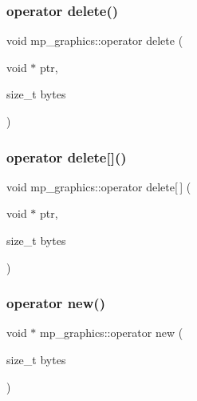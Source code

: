 \mbox{\label{classmp__graphics_a6837492938bddfa1192c3c68cc4c7626}} 
\subsubsection{\texorpdfstring{operator delete()}{operator delete()}}
{\footnotesize\ttfamily void mp\+\_\+graphics\+::operator delete (\begin{DoxyParamCaption}\item[{void $\ast$}]{ptr,  }\item[{size\+\_\+t}]{bytes }\end{DoxyParamCaption})}

\mbox{\label{classmp__graphics_a002d6cbdfd131c2925e1083781a9c8af}} 
\subsubsection{\texorpdfstring{operator delete[]()}{operator delete[]()}}
{\footnotesize\ttfamily void mp\+\_\+graphics\+::operator delete\mbox{[}$\,$\mbox{]} (\begin{DoxyParamCaption}\item[{void $\ast$}]{ptr,  }\item[{size\+\_\+t}]{bytes }\end{DoxyParamCaption})}

\mbox{\label{classmp__graphics_a99f12c4a1faf7d84e64ad089e59bd43a}} 
\subsubsection{\texorpdfstring{operator new()}{operator new()}}
{\footnotesize\ttfamily void $\ast$ mp\+\_\+graphics\+::operator new (\begin{DoxyParamCaption}\item[{size\+\_\+t}]{bytes }\end{DoxyParamCaption})}


